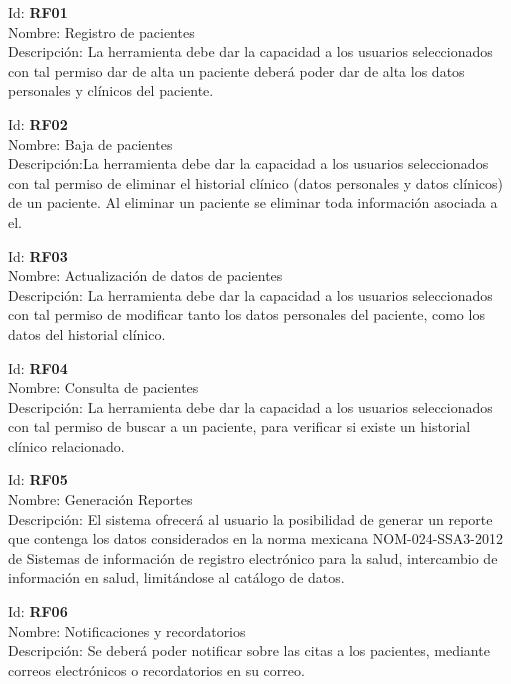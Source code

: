 \vspace{1em}

\noindent Id:  \textbf{RF01}\\
Nombre: Registro de pacientes\\
Descripción: La herramienta debe dar la capacidad a los usuarios seleccionados con tal permiso dar de alta un paciente deberá poder dar de alta los datos personales y clínicos del paciente.

\vspace{1em}

\noindent Id:  \textbf{RF02}\\
Nombre: Baja de pacientes\\
Descripción:La herramienta debe dar la capacidad a los usuarios seleccionados con tal permiso de eliminar el historial clínico (datos personales y datos clínicos) de un paciente. Al eliminar un paciente se eliminar toda información asociada a el.

\vspace{1em}

\noindent Id:  \textbf{RF03}\\
Nombre: Actualización de datos de pacientes\\
Descripción: La herramienta debe dar la capacidad a los usuarios seleccionados con tal permiso de modificar tanto los datos personales del paciente, como los datos del historial clínico.

\vspace{1em}

\noindent Id:  \textbf{RF04}\\
Nombre: Consulta de pacientes\\
Descripción: La herramienta debe dar la capacidad a los usuarios seleccionados con tal permiso de buscar a un paciente, para verificar si existe un historial clínico relacionado.

\vspace{1em}

\noindent Id:  \textbf{RF05}\\
Nombre: Generación Reportes\\
Descripción: El sistema ofrecerá al usuario la posibilidad de generar un reporte que contenga los datos considerados en la
norma mexicana NOM-024-SSA3-2012 de Sistemas de información de registro electrónico para la salud, intercambio de información en salud, limitándose al catálogo de datos.

\vspace{1em}

\noindent Id:  \textbf{RF06}\\
Nombre: Notificaciones y recordatorios\\
Descripción: Se deberá poder notificar sobre las citas a los pacientes, mediante correos electrónicos o recordatorios en su correo.

